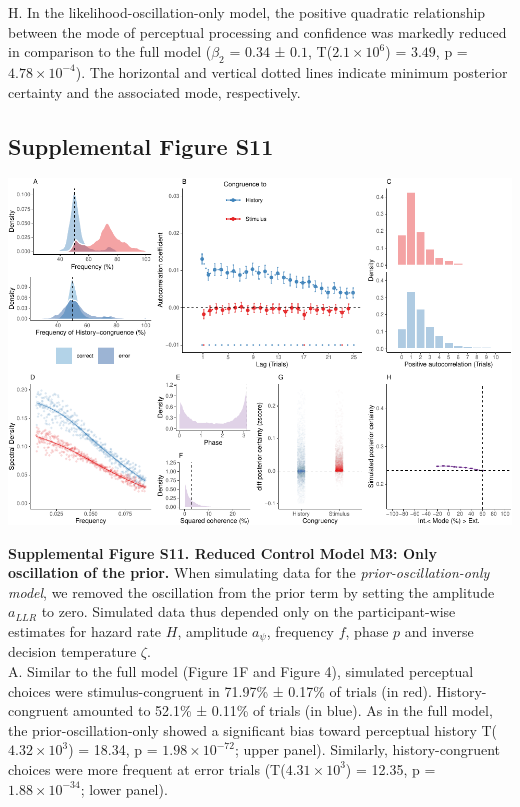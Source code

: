 \documentclass[
]{article}
\begin{document}
H. In the likelihood-oscillation-only model, the positive quadratic
relationship between the mode of perceptual processing and confidence
was markedly reduced in comparison to the full model (\(\beta_2\) =
\(0.34\) ± \(0.1\), T(\(\ensuremath{2.1\times 10^{6}}\)) = \(3.49\), p =
\(\ensuremath{4.78\times 10^{-4}}\)). The horizontal and vertical dotted
lines indicate minimum posterior certainty and the associated mode,
respectively.

\newpage

\hypertarget{supplemental-figure-s11}{%
\subsection{Supplemental Figure S11}\label{supplemental-figure-s11}}

\includegraphics{modes_mouse_rev1b_files/figure-latex/Supplemental_Figure_S11-1.pdf}

\textbf{Supplemental Figure S11. Reduced Control Model M3: Only
oscillation of the prior.} When simulating data for the
\emph{prior-oscillation-only model}, we removed the oscillation from the
prior term by setting the amplitude \(a_{LLR}\) to zero. Simulated data
thus depended only on the participant-wise estimates for hazard rate
\(H\), amplitude \(a_{\psi}\), frequency \(f\), phase \(p\) and inverse
decision temperature \(\zeta\).\\
A. Similar to the full model (Figure 1F and Figure 4), simulated
perceptual choices were stimulus-congruent in 71.97\% ± 0.17\% of trials
(in red). History-congruent amounted to 52.1\% ± 0.11\% of trials (in
blue). As in the full model, the prior-oscillation-only showed a
significant bias toward perceptual history
T(\ensuremath{4.32\times 10^{3}}) = 18.34, p =
\(\ensuremath{1.98\times 10^{-72}}\); upper panel). Similarly,
history-congruent choices were more frequent at error trials
(T(\ensuremath{4.31\times 10^{3}}) = 12.35, p =
\(\ensuremath{1.88\times 10^{-34}}\); lower panel).
\end{document}
